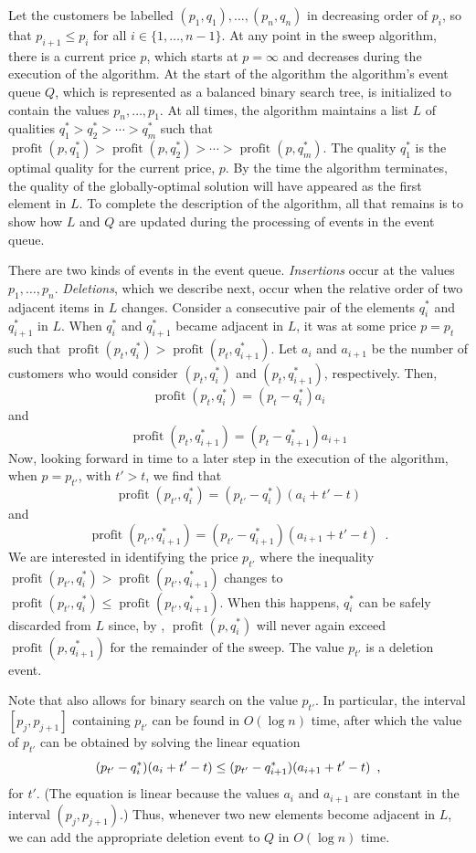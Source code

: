 \documentclass[lotsofwhite]{patmorin}
\newcommand{\val}{\operatorname{profit}}
\begin{document}
Let the customers be labelled $(p_1,q_1),\ldots,(p_n,q_n)$ in decreasing
order of $p_i$, so that $p_{i+1} \le p_i$ for all $i\in\{1,\ldots,n-1\}$.
At any point in the sweep algorithm, there is a current price $p$,
which starts at $p=\infty$ and decreases during the execution of
the algorithm.  At the start of the algorithm the algorithm's event
queue $Q$, which is represented as a balanced binary search tree, is
initialized to contain the values $p_n,\ldots, p_1$.  At all times, the
algorithm maintains a list $L$ of qualities $q_1^* > q_2^* > \cdots >
q_m^*$ such that $\val(p,q_1^*) > \val(p,q_2^*) >\cdots>\val(p,q_m^*)$.
The quality $q_1^*$ is the optimal quality for the current price, $p$.
By the time the algorithm terminates, the quality of the globally-optimal
solution will have appeared as the first element in $L$.  To complete
the description of the algorithm, all that remains is to show how $L$
and $Q$ are updated during the processing of events in the event queue.

There are two kinds of events in the event queue.  \emph{Insertions}
occur at the values $p_1,\ldots,p_n$.  \emph{Deletions}, which we describe
next, occur when the relative order of two adjacent items in $L$ changes.
Consider a consecutive pair of the elements $q^*_i$ and $q^*_{i+1}$
in $L$.  When $q^*_i$ and $q^*_{i+1}$ became adjacent in $L$, it was
at some price $p=p_t$ such that $\val(p_t,q^*_i)>\val(p_t,q^*_{i+1})$.
Let $a_i$ and $a_{i+1}$ be the number of customers who would consider
$(p_t,q^*_i)$ and $(p_t,q^*_{i+1})$, respectively. Then,
\[
  \val(p_t,q^*_i) = (p_t-q^*_i)a_i
\]
and
\[
  \val(p_t,q^*_{i+1}) = (p_t-q^*_{i+1})a_{i+1}
\]
Now, looking forward in time to a later step in the execution of
the algorithm, when $p=p_{t'}$, with $t'> t$, we find that
\[
  \val(p_{t'},q^*_i) = (p_{t'}-q^*_i)(a_i+t'-t)
\]
and
\[
  \val(p_{t'},q^*_{i+1}) = (p_{t'}-q^*_{i+1})(a_{i+1}+t'-t) \enspace .
\]
We are interested in identifying the price $p_{t'}$ where the
inequality $\val(p_{t'},q^*_i) > \val(p_{t'},q^*_{i+1})$ changes to
$\val(p_{t'},q^*_i) \le \val(p_{t'},q^*_{i+1})$.  When this happens,
$q_i^*$ can be safely discarded from $L$ since, by ,
$\val(p,q^*_i)$ will never again exceed $\val(p,q^*_{i+1})$ for the
remainder of the sweep.  The value $p_{t'}$ is a deletion event.

Note that  also allows for binary search on the value
$p_{t'}$.  In particular, the interval $[p_j,p_{j+1}]$ containing $p_{t'}$ can be found in $O(\log n)$ time, after which the value of $p_{t'}$ can be obtained by solving the linear equation
\[  (p_{t'}-q^*_i)(a_i+t'-t) \le (p_{t'}-q^*_{i+1})(a_{i+1}+t'-t)  \enspace ,
    \eqlabel{halfplane}
\]
for $t'$.  (The equation is linear because the values $a_i$ and $a_{i+1}$
are constant in the interval $(p_j,p_{j+1})$.) Thus, whenever two new
elements become adjacent in $L$, we can add the appropriate deletion
event to $Q$ in $O(\log n)$ time.
\end{document}
